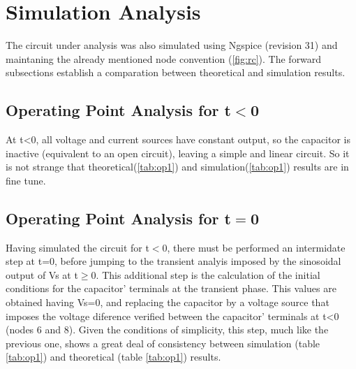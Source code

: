 \section{Simulation Analysis}
\label{sec:simulation}

The circuit under analysis was also simulated using Ngspice (revision 31) and maintaning the already mentioned node convention (\ref{fig:rc}). The forward subsections establish a comparation between theoretical and simulation results.

\subsection{Operating Point Analysis for t$<$0}

At t<0, all voltage and current sources have constant output, so the capacitor is inactive (equivalent to an open circuit), leaving a simple and linear circuit. So it is not strange that theoretical(\ref{tab:op1}) and simulation(\ref{tab:op1}) results are in fine tune.

\begin{table}[h]
  \centering
 \caption{Simulation results. A variable preceded by @ is of type {\em current}
   and expressed in Ampere; other variables are of type {\it voltage} and expressed in
   Volt.}
  \label{tab:op1}
\end{table}

\subsection{Operating Point Analysis for t$=$0}

Having simulated the circuit for t$<$0, there must be performed an intermidate step at t=0, before jumping to the transient analyis imposed by the sinosoidal output of Vs at t$\geq$0. This additional step is the calculation of the initial conditions for the capacitor' terminals at the transient phase. This values are obtained having Vs=0, and replacing the capacitor by a voltage source that imposes the voltage diference verified between the capacitor' terminals at t<0 (nodes 6 and 8). Given the conditions of simplicity, this step, much like the previous one, shows a great deal of consistency between simulation (table \ref{tab:op1}) and theoretical (table \ref{tab:op1}) results. 

